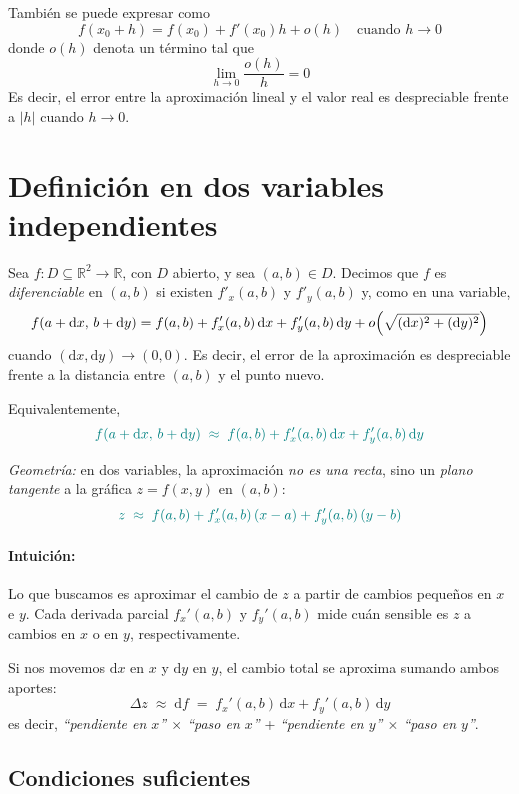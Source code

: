 \documentclass{article}
\begin{document}
También se puede expresar como
\[
f(x_0+h)=f(x_0)+f'(x_0)h+o(h)
\quad \text{cuando } h\to 0
\]
donde \(o(h)\) denota un término tal que
\[
\lim_{h\to 0}\frac{o(h)}{h}=0
\]
Es decir, el error entre la aproximación lineal y el valor real es despreciable frente a \(|h|\) cuando \(h\to 0\).


\section*{Definición en dos variables independientes}
Sea \(f\colon D\subseteq\mathbb{R}^2\to\mathbb{R}\), con \(D\) abierto, y sea \((a,b)\in D\). Decimos que \(f\) es \emph{diferenciable} en \((a,b)\) si existen \(f'_x(a,b)\) y \(f'_y(a,b)\) y, como en una variable,
\[
f(a+\mathrm{d}x,\,b+\mathrm{d}y)=f(a,b)+f'_x(a,b)\,\mathrm{d}x+f'_y(a,b)\,\mathrm{d}y+o\Bigl(\sqrt{(\mathrm{d}x)^2+(\mathrm{d}y)^2}\Bigr)
\]
cuando \((\mathrm{d}x,\mathrm{d}y)\to(0,0)\). Es decir, el error de la aproximación es despreciable frente a la distancia entre \((a,b)\) y el punto nuevo.


Equivalentemente,
\[
\color{teal}
f(a+\mathrm{d}x,\,b+\mathrm{d}y)
\;\approx\;
f(a,b)
+
f_x'(a,b)\,\mathrm{d}x
+
f_y'(a,b)\,\mathrm{d}y
\]

\noindent\textit{Geometría:} en dos variables, la aproximación \emph{no es una recta}, sino un \emph{plano tangente} a la gráfica \(z=f(x,y)\) en \((a,b)\):
\[
\color{teal}
z
\;\approx\;
f(a,b)
+
f_x'(a,b)\,(x-a)
+
f_y'(a,b)\,(y-b)
\]

\paragraph*{Intuición:}
Lo que buscamos es aproximar el cambio de \(z\) a partir de cambios pequeños en \(x\) e \(y\).
Cada derivada parcial \(f_x'(a,b)\) y \(f_y'(a,b)\) mide cuán sensible es \(z\) a cambios en \(x\) o en \(y\), respectivamente.

Si nos movemos \(\mathrm{d}x\) en \(x\) y \(\mathrm{d}y\) en \(y\), el cambio total se aproxima sumando ambos aportes:
\[
\Delta z
\;\approx\;
\mathrm{d}f
\;=\;
f_x'(a,b)\,\mathrm{d}x
+
f_y'(a,b)\,\mathrm{d}y
\]
es decir,
\emph{\color{teal}“pendiente en \(x\)” \(\times\) “paso en \(x\)”}
+
\emph{\color{teal}“pendiente en \(y\)” \(\times\) “paso en \(y\)”}.


\subsection*{Condiciones suficientes}
\end{document}
